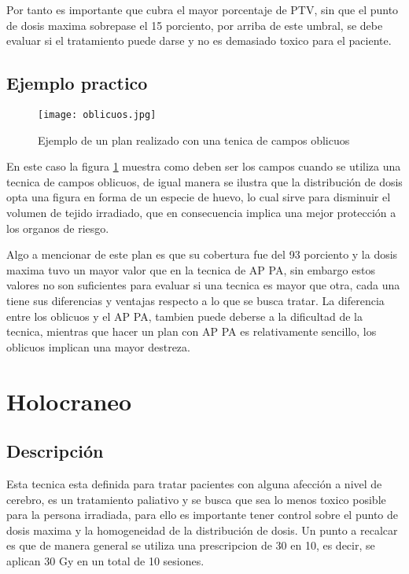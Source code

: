 \documentclass{article}
\begin{document}
\vspace{10pt}


Por tanto es importante que cubra el mayor porcentaje de PTV, sin que el punto de dosis maxima sobrepase el 15 porciento, por arriba de este umbral, se debe evaluar si el tratamiento puede darse y no es demasiado toxico para el paciente.

\vspace{10pt}



\subsection{Ejemplo practico}

\begin{figure}[h!]
    \centering
    \texttt{[image: oblicuos.jpg]}
    \caption{Ejemplo de un plan realizado con una tenica de campos oblicuos}
    \label{a2}
\end{figure}


En este caso la figura \ref{a2} muestra como deben ser los campos cuando se utiliza una tecnica de campos oblicuos, de igual manera se ilustra que la distribución de dosis opta una figura en forma de un especie de huevo, lo cual sirve para disminuir el volumen de tejido irradiado, que en consecuencia implica una mejor protección a los organos de riesgo. 

\vspace{10pt}

Algo a mencionar de este plan es que su cobertura fue del 93 porciento y la dosis maxima tuvo un mayor valor que en la tecnica de AP PA, sin embargo estos valores no son suficientes para evaluar si una tecnica es mayor que otra, cada una tiene sus diferencias y ventajas respecto a lo que se busca tratar. La diferencia entre los oblicuos y el AP PA, tambien puede deberse a la dificultad de la tecnica, mientras que hacer un plan con AP PA es relativamente sencillo, los oblicuos implican una mayor destreza. 


\section{Holocraneo}

\subsection{Descripción}

Esta tecnica esta definida para tratar pacientes con alguna afección a nivel de cerebro, es un tratamiento paliativo y se busca que sea lo menos toxico posible para la persona irradiada, para ello es importante tener control sobre el punto de dosis maxima y la homogeneidad de la distribución de dosis. Un punto a recalcar es que de manera general se utiliza una prescripcion de 30 en 10, es decir, se aplican 30 Gy en un total de 10 sesiones.
\end{document}
